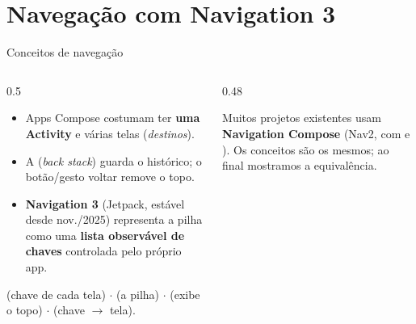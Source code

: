 \documentclass[aspectratio=169,10pt]{beamer}
\begin{document}
\section{Navegação com Navigation 3}

\begin{frame}{Conceitos de navegação}
  \begin{columns}[c]
    \begin{column}{0.5\textwidth}
      \small
      \begin{itemize}
        \item Apps Compose costumam ter \textbf{uma Activity} e várias telas (\emph{destinos}).
        \item A  (\emph{back stack}) guarda o histórico; o botão/gesto voltar remove o topo.
        \item \textbf{Navigation 3} (Jetpack, estável desde nov./2025) representa a pilha como uma \textbf{lista observável de chaves} controlada pelo próprio app.
      \end{itemize}
      \begin{conceito}[Peças]
         (chave de cada tela) $\cdot$  (a pilha) $\cdot$  (exibe o topo) $\cdot$  (chave $\rightarrow$ tela).
      \end{conceito}
    \end{column}
    \begin{column}{0.48\textwidth}
      \centering
      \begin{dica}
        Muitos projetos existentes usam \textbf{Navigation Compose} (Nav2, com  e ). Os conceitos são os mesmos; ao final mostramos a equivalência.
      \end{dica}
    \end{column}
  \end{columns}
\end{frame}
\end{document}
